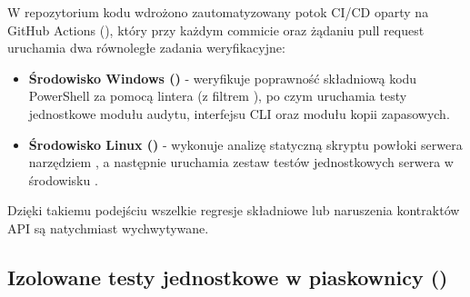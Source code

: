 W repozytorium kodu wdrożono zautomatyzowany potok CI/CD oparty na GitHub Actions (), który przy każdym commicie oraz żądaniu pull request uruchamia dwa równoległe zadania weryfikacyjne:
\begin{itemize}
    \item \textbf{Środowisko Windows ()} - weryfikuje poprawność składniową kodu PowerShell za pomocą lintera  (z filtrem ), po czym uruchamia testy jednostkowe modułu audytu, interfejsu CLI oraz modułu kopii zapasowych.
    \item \textbf{Środowisko Linux ()} - wykonuje analizę statyczną skryptu powłoki serwera  narzędziem , a następnie uruchamia zestaw testów jednostkowych serwera w środowisku .
\end{itemize}

Dzięki takiemu podejściu wszelkie regresje składniowe lub naruszenia kontraktów API są natychmiast wychwytywane.

\subsection{Izolowane testy jednostkowe w piaskownicy ()}\label{subsec:testy-jednostkowe}

